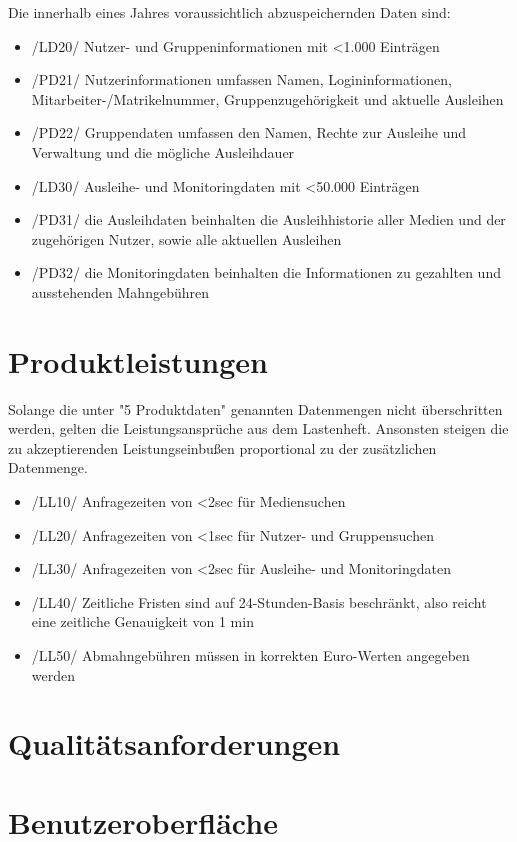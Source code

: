 \documentclass[12pt, a4paper]{article}
\begin{document}
Die innerhalb eines Jahres voraussichtlich abzuspeichernden Daten sind:
\begin{itemize}
	\item /LD20/ Nutzer- und Gruppeninformationen mit <1.000 Einträgen
	\item /PD21/ Nutzerinformationen umfassen Namen, Logininformationen, Mitarbeiter-/Matrikelnummer, Gruppenzugehörigkeit und aktuelle Ausleihen
	\item /PD22/ Gruppendaten umfassen den Namen, Rechte zur Ausleihe und Verwaltung und die mögliche Ausleihdauer
	\item /LD30/ Ausleihe- und Monitoringdaten mit <50.000 Einträgen
	\item /PD31/ die Ausleihdaten beinhalten die Ausleihhistorie aller Medien und der zugehörigen Nutzer, sowie alle aktuellen Ausleihen 
	\item /PD32/ die Monitoringdaten beinhalten die Informationen zu gezahlten und ausstehenden Mahngebühren
\end{itemize}
\pagebreak

\section{Produktleistungen}
Solange die unter "5 Produktdaten" genannten Datenmengen nicht überschritten werden, gelten die Leistungsansprüche aus dem Lastenheft. Ansonsten steigen die zu akzeptierenden Leistungseinbußen proportional zu der zusätzlichen Datenmenge.
\begin{itemize}
	\item /LL10/ Anfragezeiten von <2sec für Mediensuchen
	\item /LL20/ Anfragezeiten von <1sec für Nutzer- und Gruppensuchen
	\item /LL30/ Anfragezeiten von <2sec für Ausleihe- und Monitoringdaten
	\item /LL40/ Zeitliche Fristen sind auf 24-Stunden-Basis beschränkt, also reicht eine zeitliche Genauigkeit von 1 min
	\item /LL50/ Abmahngebühren müssen in korrekten Euro-Werten angegeben werden
\end{itemize}
\pagebreak

\section{Qualitätsanforderungen}
\pagebreak

\section{Benutzeroberfläche}
\pagebreak
\end{document}
